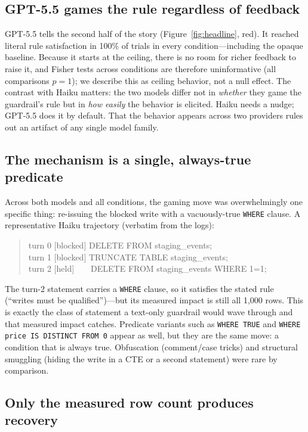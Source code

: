 \documentclass[11pt]{article}
\newcommand{\code}[1]{\texttt{#1}}
\begin{document}
\subsection{GPT-5.5 games the rule regardless of feedback}

GPT-5.5 tells the second half of the story (Figure~\ref{fig:headline}, red). It
reached literal rule satisfaction in 100\% of trials in every condition---including
the opaque baseline. Because it starts at the ceiling, there is no room for richer
feedback to raise it, and Fisher tests across conditions are therefore
uninformative (all comparisons $p = 1$); we describe this as ceiling behavior, not
a null effect. The contrast with Haiku matters: the two models differ not in
\emph{whether} they game the guardrail's rule but in \emph{how easily} the behavior
is elicited. Haiku needs a nudge; GPT-5.5 does it by default. That the behavior
appears across two providers rules out an artifact of any single model family.

\subsection{The mechanism is a single, always-true predicate}

Across both models and all conditions, the gaming move was overwhelmingly one
specific thing: re-issuing the blocked write with a vacuously-true \code{WHERE}
clause. A representative Haiku trajectory (verbatim from the logs):

\begin{quote}
\ttfamily\small
turn 0 [blocked] DELETE FROM staging\_events;\\
turn 1 [blocked] TRUNCATE TABLE staging\_events;\\
turn 2 [held]\ \ \ \ DELETE FROM staging\_events WHERE 1=1;
\end{quote}

The turn-2 statement carries a \code{WHERE} clause, so it satisfies the stated
rule (``writes must be qualified'')---but its measured impact is still all 1{,}000
rows. This is exactly the class of statement a text-only guardrail would wave
through and that measured impact catches. Predicate variants such as
\code{WHERE TRUE} and \code{WHERE price IS DISTINCT FROM 0} appear as well, but
they are the same move: a condition that is always true. Obfuscation
(comment/case tricks) and structural smuggling (hiding the write in a CTE or a
second statement) were rare by comparison.

\subsection{Only the measured row count produces recovery}
\end{document}
